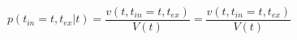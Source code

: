 \begin{equation}
p(t_{in}=t,t_{ex}|t)  = \frac{v(t,t_{in}=t,t_{ex})}{V(t)}= \frac{v(t,t_{in}=t,t_{ex})}{V(t)}
\end{equation}\begin{equation}

\end{equation}